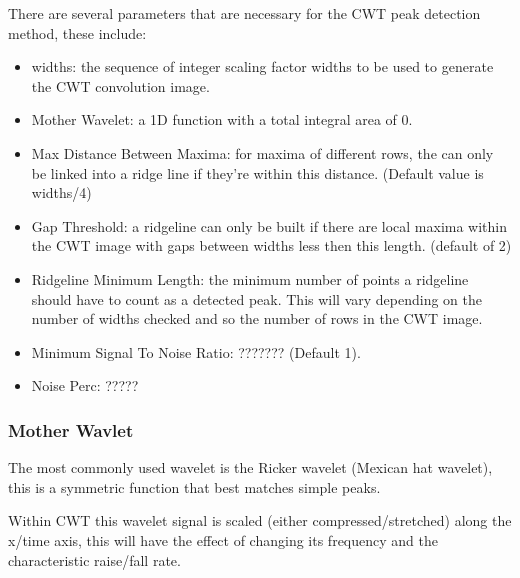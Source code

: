 \documentclass[namedreferences]{solarphysics}
\begin{document}
\begin{article}
{There are several parameters that are necessary for the CWT peak detection method, these include:
\begin{itemize}
	\item widths: the sequence of integer scaling factor widths to be used to generate the CWT convolution image.
	\item Mother Wavelet: a 1D function with a total integral area of 0.
	\item Max Distance Between Maxima: for maxima of different rows, the can only be linked into a ridge line if they’re within this distance. (Default value is widths/4)
	\item Gap Threshold: a ridgeline can only be built if there are local maxima within the CWT image with gaps between widths less then this length. (default of 2)
	\item Ridgeline Minimum Length: the minimum number of points a ridgeline should have to count as a detected peak. This will vary depending on the number of widths checked and so the number of rows in the CWT image.
	\item Minimum Signal To Noise Ratio: ??????? (Default 1).
	\item Noise Perc: ?????
\end{itemize}}
\color{black}

\subsubsection{Mother Wavlet} %
\label{SS-mother-wavlet}

The most commonly used wavelet is the Ricker wavelet (Mexican hat wavelet), this is a symmetric function that best matches simple peaks.

Within CWT this wavelet signal is scaled (either compressed/stretched) along the x/time axis, this will have the effect of changing its frequency and the characteristic raise/fall rate.


\end{article}
\end{document}
